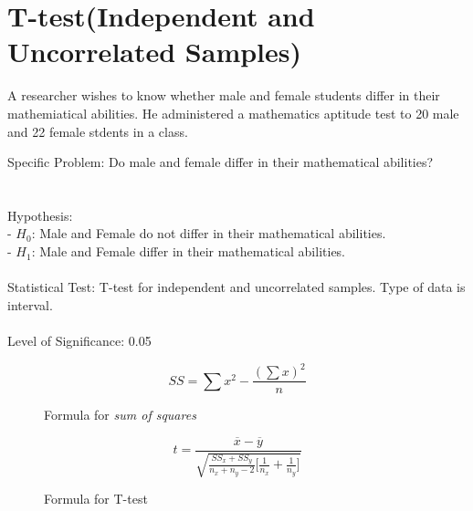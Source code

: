\documentclass{article}
\begin{document}
    \section*{T-test(Independent and Uncorrelated Samples)}
    \begin{center}
        A researcher wishes to know whether male and female students differ in their mathemiatical abilities.
        He administered a mathematics aptitude test to 20 male and 22 female stdents in a class.
    \end{center}
    Specific Problem: Do male and female differ in their mathematical abilities?\\\\\\
    Hypothesis:\\
    -\hspace{1cm} $H_0$: Male and Female do not differ in their mathematical abilities.\\
    -\hspace{1cm} $H_1$: Male and Female differ in their mathematical abilities.\\\\
    Statistical Test: T-test for independent and uncorrelated samples. Type of data is interval.\\\\
    Level of Significance: 0.05\\
    \begin{figure*}[ht!]
        \begin{equation}
            SS=\sum x^2-\frac{(\sum x)^2}{n}
        \end{equation}
        \caption{Formula for \emph{sum of squares}}
    \end{figure*}
    \begin{figure*}[ht!]
        \begin{equation}
            t=\frac{\overline{x}-\overline{y}}{\sqrt{\frac{SS_x+SS_y}{n_x+n_y-2}\bigl[\frac{1}{n_x}+\frac{1}{n_y}\bigr]}}
        \end{equation}
        \caption{Formula for T-test}
    \end{figure*}
    \newpage
\end{document}
